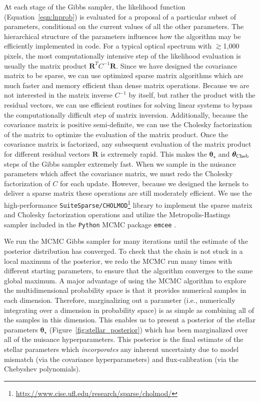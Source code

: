 \documentclass[iop,floatfix]{emulateapj}
\newcommand{\vt}{ {\bm \theta}}
\newcommand{\vtstar}{\vt_{\star}}
\newcommand{\vtcheb}{\vt_{\rm Cheb}}
\newcommand{\fR}{ {\bm R}}
\begin{document}
At each stage of the Gibbs sampler, the likelihood function (Equation~\ref{eqn:lnprob}) is evaluated for a proposal of a particular subset of parameters, conditional on the current values of all the other parameters. The hierarchical structure of the parameters influences how the algorithm may be efficiently implemented in code. For a typical optical spectrum with $\gtrsim$1,000 pixels, the most computationally intensive step of the likelihood evaluation is usually the matrix product $\fR^T C^{-1} \fR$. Since we have designed the covariance matrix to be sparse, we can use optimized sparse matrix algorithms which are much faster and memory efficient than dense matrix operations. Because we are not interested in the matrix inverse $C^{-1}$ by itself, but rather the product with the residual vectors, we can use efficient routines for solving linear systems to bypass the computationally difficult step of matrix inversion. Additionally, because the covariance matrix is positive semi-definite, we can use the Cholesky factorization of the matrix to optimize the evaluation of the matrix product. Once the covariance matrix is factorized, any subsequent evaluation of the matrix product for different residual vectors $\fR$ is extremely rapid. This makes the $\vtstar$ and $\vtcheb$ steps of the Gibbs sampler extremely fast.
When we sample in the nuisance parameters which affect the covariance matrix, we must redo the Cholesky factorization of $C$ for each update. However, because we designed the kernels to deliver a sparse matrix these operations are still moderately efficient.  We use the high-performance \texttt{SuiteSparse/CHOLMOD}\footnote{\url{http://www.cise.ufl.edu/research/sparse/cholmod/}} library to implement the sparse matrix and Cholesky factorization operations \citep{chen08, davis09} and utilize the Metropolis-Hastings sampler included in the \texttt{Python} MCMC package \texttt{emcee} \citep{foreman-mackey12}.

We run the MCMC Gibbs sampler for many iterations until the estimate of the posterior distribution has converged. To check that the chain is not stuck in a local maximum of the posterior, we redo the MCMC run many times with different starting parameters, to ensure that the algorithm converges to the same global maximum. A major advantage of using the MCMC algorithm to explore the multidimensional probability space is that it provides numerical samples in each dimension. Therefore, marginalizing out a parameter (i.e., numerically integrating over a dimension in probability space) is as simple as combining all of the samples in this dimension. This enables us to present a posterior of the stellar parameters $\vtstar$ (Figure~\ref{fig:stellar_posterior}) which has been marginalized over all of the nuisance hyperparameters. This posterior is the final estimate of the stellar parameters which \emph{incorporates} any inherent uncertainty due to model mismatch (via the covariance hyperparameters) and flux-calibration (via the Chebyshev polynomials).
\end{document}
